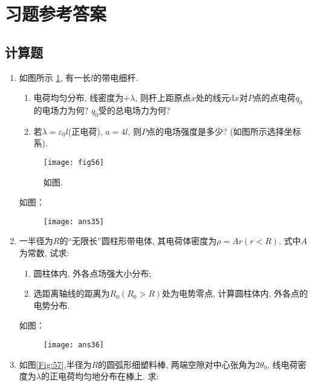 \section{习题参考答案}
\subsection*{计算题}
\begin{enumerate}
    \item 如图所示 \ref{Fig:56}, 有一长$l$的带电细杆.
    \begin{enumerate}
        \item[(1)] 电荷均匀分布, 线密度为$+\lambda$, 则杆上距原点$x$处的线元$\mathrm{d}x$对$P$点的点电荷$q_0$的电场力为何? $q_0$受的总电场力为何?
        \item[(2)] 若$\lambda=\varepsilon_0 l$(正电荷), $a=4l$, 则$P$点的电场强度是多少? (如图所示选择坐标系).
    \end{enumerate}
    \begin{figure}[H]
        \centering
        \texttt{[image: fig56]}
        \caption{如图.}\label{Fig:56}
    \end{figure}
    \begin{solution}
        如图：
        \begin{figure}[H]
            \centering
            \texttt{[image: ans35]}
        \end{figure}
    \end{solution}
    \item 一半径为$R$的“无限长”圆柱形带电体, 其电荷体密度为$\rho=Ar(r<R)$, 式中$A$为常数, 试求:
    \begin{enumerate}
        \item[(1)] 圆柱体内, 外各点场强大小分布;
        \item[(2)] 选距离轴线的距离为$R_0(R_0>R)$处为电势零点, 计算圆柱体内, 外各点的电势分布.
    \end{enumerate}
    \begin{solution}
        如图：
        \begin{figure}[H]
            \centering
            \texttt{[image: ans36]}
        \end{figure}
    \end{solution}
    \item 如图\ref{Fig:57},半径为$R$的圆弧形细塑料棒, 两端空隙对中心张角为$2\theta_0$, 线电荷密度为$\lambda$的正电荷均匀地分布在棒上. 求:
    \begin{enumerate}

\end{enumerate}
\end{enumerate}

